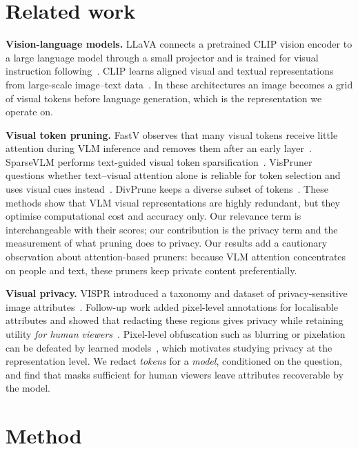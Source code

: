 \documentclass{article}
\begin{document}
\section{Related work}

\textbf{Vision-language models.} LLaVA connects a pretrained CLIP vision encoder to a large language model through a small projector
and is trained for visual instruction following~\cite{liu2024improved}. CLIP learns aligned visual and textual representations from
large-scale image--text data~\cite{radford2021learning}. In these architectures an image becomes a grid of visual tokens before language
generation, which is the representation we operate on.

\textbf{Visual token pruning.} FastV observes that many visual tokens receive little attention during VLM inference and removes them
after an early layer~\cite{chen2024imageworth12tokens}. SparseVLM performs text-guided visual token sparsification~\cite{pmlr-v267-zhang25s}.
VisPruner questions whether text--visual attention alone is reliable for token selection and uses visual cues instead~\cite{Zhang_2025_ICCV}.
DivPrune keeps a diverse subset of tokens~\cite{alvar2025divprune}. These methods show that VLM visual representations are highly redundant,
but they optimise computational cost and accuracy only. Our relevance term is interchangeable with their scores; our contribution is the privacy
term and the measurement of what pruning does to privacy. Our results add a cautionary observation about attention-based pruners: because
VLM attention concentrates on people and text, these pruners keep private content preferentially.

\textbf{Visual privacy.} VISPR introduced a taxonomy and dataset of privacy-sensitive image attributes~\cite{orekondy2017towards}. Follow-up work
added pixel-level annotations for localisable attributes and showed that redacting these regions gives privacy while retaining utility
\emph{for human viewers}~\cite{orekondy2018connecting}. Pixel-level obfuscation such as blurring or pixelation can be defeated by learned
models~\cite{mcpherson2016defeating}, which motivates studying privacy at the representation level. We redact \emph{tokens} for a \emph{model},
conditioned on the question, and find that masks sufficient for human viewers leave attributes recoverable by the model.

\section{Method}\label{sec:method}
\end{document}
